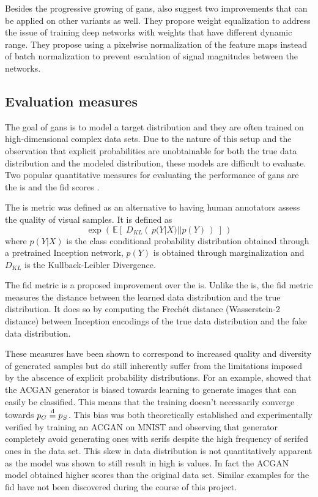 Besides the progressive growing of \acrshort{gans}, \textcite{karras2017progressive} also suggest two improvements that can be applied on other variants as well. They propose weight equalization to address the issue of training deep networks with weights that have different dynamic range. They propose using a pixelwise normalization of the feature maps instead of batch normalization to prevent escalation of signal magnitudes between the networks.

\subsection{Evaluation measures}
The goal of \acrshort{gans} is to model a target distribution and they are often trained on high-dimensional complex data sets. Due to the nature of this setup and the observation that explicit probabilities are unobtainable for both the true data distribution and the modeled distribution, these models are difficult to evaluate. Two popular quantitative measures for evaluating the performance of \acrshort{gans} are the \acrfull{is} \parencite{salimans2016improved} and the \acrfull{fid} scores \parencite{heuselRUNKH2017FID}.

The \acrlong{is} metric was defined as an alternative to having human annotators assess the quality of visual samples. It is defined as 
\begin{equation}
    \exp \left(\,\mathbb{E}\left[\;D_{KL}\left(\,p(Y|X) || p(Y)\,\right)\;\right]\,\right)
\end{equation}
where $p(Y|X)$ is the class conditional probability distribution obtained through a pretrained Inception network, $p(Y)$ is obtained through marginalization and $D_{KL}$ is the Kullback-Leibler Divergence.

The \acrlong{fid} metric is a proposed improvement over the \acrlong{is}. Unlike the \acrlong{is}, the \acrlong{fid} metric measures the distance between the learned data distribution and the true distribution. It does so by computing the Frechét distance (Wasserstein-2 distance) between Inception encodings of the true data distribution and the fake data distribution.

These measures have been shown to correspond to increased quality and diversity of generated samples but do still inherently suffer from the limitations imposed by the abscence of explicit probability distributions. For an example, \textcite{shuac2017acganisbad} showed that the ACGAN generator is biased towards learning to generate images that can easily be classified. This means that the training doesn't necessarily converge towards $p_G \stackrel{\text{d}}{=} p_S$. This bias was both theoretically established and experimentally verified by training an ACGAN on MNIST and observing that generator completely avoid generating ones with serifs despite the high frequency of serifed ones in the data set. This skew in data distribution is not quantitatively apparent as the model was shown to still result in high \acrshort{is} values. In fact the ACGAN model obtained higher scores than the original data set. Similar examples for the \acrshort{fid} have not been discovered during the course of this project. 

